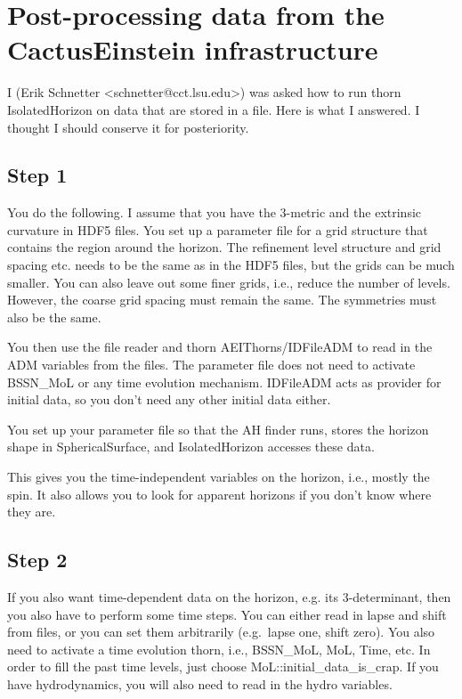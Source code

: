 \section{Post-processing data from the CactusEinstein infrastructure}

I (Erik Schnetter \textless schnetter@cct.lsu.edu\textgreater) was
asked how to run thorn IsolatedHorizon on data that are stored in a
file.  Here is what I answered.  I thought I should conserve it for
posteriority.



\subsection{Step 1}

You do the following.  I assume that you have the 3-metric and the
extrinsic curvature in HDF5 files.  You set up a parameter file for a
grid structure that contains the region around the horizon.  The
refinement level structure and grid spacing etc. needs to be the same
as in the HDF5 files, but the grids can be much smaller.  You can also
leave out some finer grids, i.e., reduce the number of levels.
However, the coarse grid spacing must remain the same.  The symmetries
must also be the same.

You then use the file reader and thorn AEIThorns/IDFileADM to read in
the ADM variables from the files.  The parameter file does not need to
activate BSSN\_MoL or any time evolution mechanism.  IDFileADM acts as
provider for initial data, so you don't need any other initial data
either.

You set up your parameter file so that the AH finder runs, stores the
horizon shape in SphericalSurface, and IsolatedHorizon accesses these
data.

This gives you the time-independent variables on the horizon, i.e.,
mostly the spin.  It also allows you to look for apparent horizons if
you don't know where they are.



\subsection{Step 2}

If you also want time-dependent data on the horizon, e.g. its
3-determinant, then you also have to perform some time steps.  You can
either read in lapse and shift from files, or you can set them
arbitrarily (e.g.\ lapse one, shift zero).  You also need to activate
a time evolution thorn, i.e., BSSN\_MoL, MoL, Time, etc.  In order to
fill the past time levels, just choose MoL::initial\_data\_is\_crap.
If you have hydrodynamics, you will also need to read in the hydro
variables.


